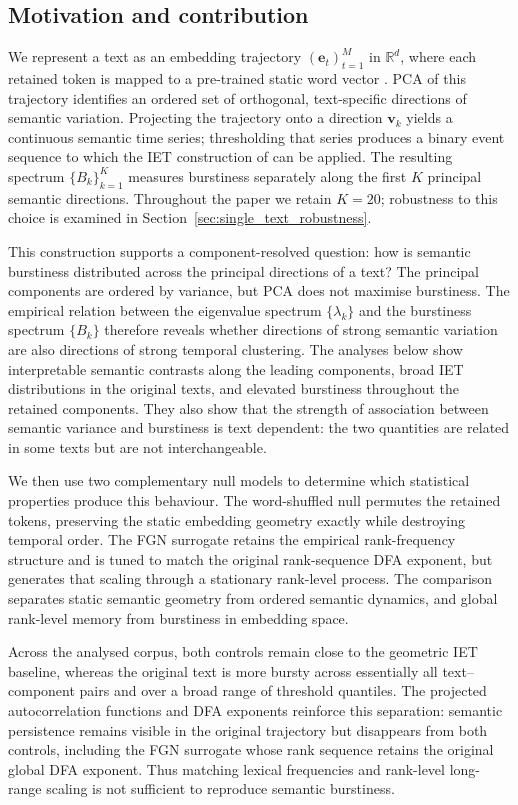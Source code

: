 \documentclass[preprint]{elsarticle}
\newcommand{\R}{\mathbb{R}}
\begin{document}
 
\subsection{Motivation and contribution}
 
We represent a text as an embedding trajectory
$(\mathbf{e}_t)_{t=1}^M$ in $\R^d$, where each retained token is mapped
to a pre-trained static word vector
\citep{Mikolov2013,Pennington2014}.
PCA of this trajectory identifies an ordered set of orthogonal,
text-specific directions of semantic variation.
Projecting the trajectory onto a direction $\mathbf{v}_k$ yields a
continuous semantic time series; thresholding that series produces a
binary event sequence to which the IET construction of
\citet{Altmann2012} can be applied.
The resulting spectrum $\{B_k\}_{k=1}^K$ measures burstiness separately
along the first $K$ principal semantic directions.
Throughout the paper we retain $K=20$; 
robustness to this choice is examined in Section~\ref{sec:single_text_robustness}.
 
This construction supports a component-resolved question:
how is semantic burstiness distributed across the principal directions
of a text?
The principal components are ordered by variance, but PCA does not
maximise burstiness.
The empirical relation between the eigenvalue spectrum
$\{\lambda_k\}$ and the burstiness spectrum $\{B_k\}$ therefore reveals
whether directions of strong semantic variation are also directions of
strong temporal clustering.
The analyses below show interpretable semantic contrasts along the
leading components, broad IET distributions in the original texts, and
elevated burstiness throughout the retained components.
They also show that the strength of association between semantic
variance and burstiness is text dependent: the two quantities are
related in some texts but are not interchangeable.
 
We then use two complementary null models to determine which statistical
properties produce this behaviour.
The word-shuffled null permutes the retained tokens, preserving the
static embedding geometry exactly while destroying temporal order.
The FGN surrogate retains the empirical rank-frequency structure and is
tuned to match the original rank-sequence DFA exponent, but generates
that scaling through a stationary rank-level process.
The comparison separates static semantic geometry from ordered semantic
dynamics, and global rank-level memory from burstiness in embedding
space.
 
Across the analysed corpus, both controls remain close to the geometric
IET baseline, whereas the original text is more bursty across essentially
all text--component pairs and over a broad range of threshold quantiles.
The projected autocorrelation functions and DFA exponents reinforce this
separation: semantic persistence remains visible in the original
trajectory but disappears from both controls, including the FGN
surrogate whose rank sequence retains the original global DFA exponent.
Thus matching lexical frequencies and rank-level long-range scaling is
not sufficient to reproduce semantic burstiness.
 
\end{document}
